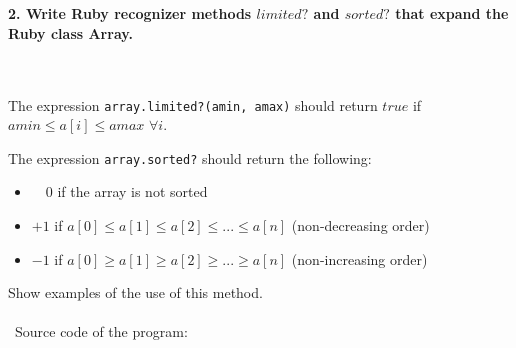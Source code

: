 \documentclass{article}
\begin{document}
\begin{verbatim} 

\end{verbatim}

\paragraph{}\




\paragraph{}\
\paragraph{}\


	\paragraph{2. Write Ruby recognizer methods \(limited?\) and \(sorted?\) that expand the Ruby class Array.}\ \newline
	
	The expression \texttt{array.limited?(amin, amax)} should return \(true\) if  \(amin  \leqslant  a[i]  \leqslant  amax\) \(\forall i\). \newline
	
	The expression \texttt{array.sorted?} should return the following: 
	\begin{itemize}
		\item \ \ \(0\) \quad  if the array is not sorted
		\item \(+1\) \quad if \(a[0] \leqslant a[1] \leqslant a[2] \leqslant ... \leqslant a[n]\) (non-decreasing order)
		\item \(-1\) \quad if \(a[0] \geqslant a[1] \geqslant a[2] \geqslant ... \geqslant a[n]\) (non-increasing order)
	\end{itemize}
	
	Show examples of the use of this method.

\paragraph{}\	
Source code of the program:

\begin{verbatim} 

\end{verbatim}	
\end{document}
